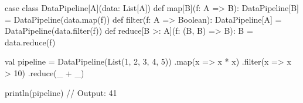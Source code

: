 case class DataPipeline[A](data: List[A]) {
  def map[B](f: A => B): DataPipeline[B] = DataPipeline(data.map(f))
  def filter(f: A => Boolean): DataPipeline[A] = DataPipeline(data.filter(f))
  def reduce[B >: A](f: (B, B) => B): B = data.reduce(f)
}

val pipeline = DataPipeline(List(1, 2, 3, 4, 5))
                .map(x => x * x)
                .filter(x => x > 10)
                .reduce(_ + _)

println(pipeline) // Output: 41
